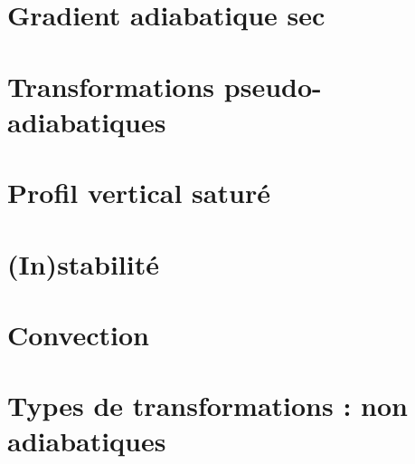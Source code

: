 \documentclass[a4paper,DIV16,10pt]{scrartcl}
\begin{document}
\newpage
\section{Gradient adiabatique sec}


\newpage
\section{Transformations pseudo-adiabatiques}


\newpage
\section{Profil vertical saturé}


\newpage
\section{(In)stabilité}


\newpage
\section{Convection}


\newpage
\section{Types de transformations : non adiabatiques}

\end{document}
